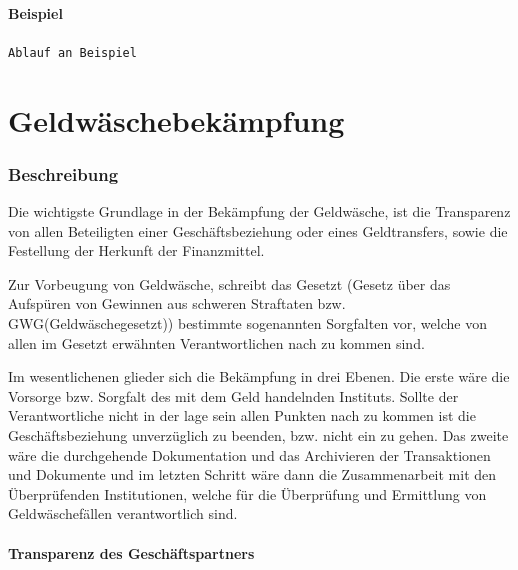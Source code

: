 \documentclass{article}
\begin{document}
        \subsection[Beispiel]{Beispiel}

            \texttt{Ablauf an Beispiel}

\newpage

\part[Bekämpfung]{Geldwäschebekämpfung}

    \section[Beschreibung]{Beschreibung}

        Die wichtigste Grundlage in der Bekämpfung der Geldwäsche, ist die Transparenz von allen Beteiligten einer Geschäftsbeziehung oder eines Geldtransfers, sowie die Festellung der Herkunft der Finanzmittel.

        Zur Vorbeugung von Geldwäsche, schreibt das Gesetzt (Gesetz über das Aufspüren von Gewinnen aus schweren Straftaten bzw. GWG(Geldwäschegesetzt)) bestimmte sogenannten Sorgfalten vor, welche von allen im Gesetzt erwähnten Verantwortlichen nach zu kommen sind.

        Im wesentlichenen glieder sich die Bekämpfung in drei Ebenen. Die erste wäre die Vorsorge bzw. Sorgfalt des mit dem Geld handelnden Instituts. Sollte der Verantwortliche nicht in der lage sein allen Punkten nach zu kommen ist die Geschäftsbeziehung unverzüglich zu beenden, bzw. nicht ein zu gehen. Das zweite wäre die durchgehende Dokumentation und das Archivieren der Transaktionen und Dokumente und im letzten Schritt wäre dann die Zusammenarbeit mit den Überprüfenden Institutionen, welche für die Überprüfung und Ermittlung von Geldwäschefällen verantwortlich sind.

        \subsection[Transparenz des Geschäftspartners]{Transparenz des Geschäftspartners}
\end{document}
